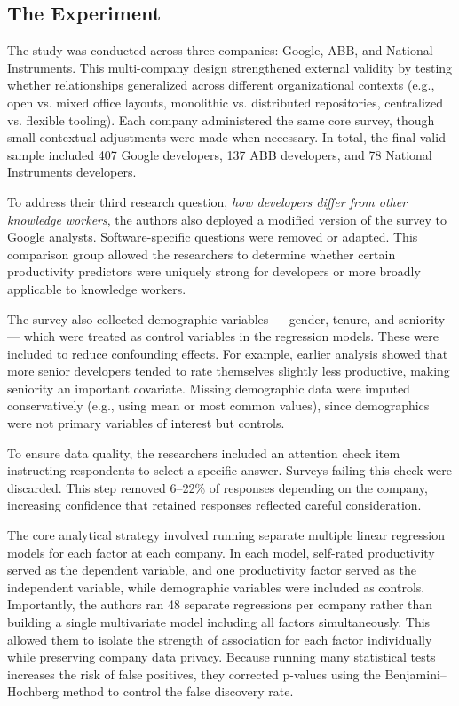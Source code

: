 \subsection{The Experiment}
The study was conducted across three companies: Google, ABB, and National Instruments. This multi-company design strengthened external validity by testing whether relationships generalized across different organizational contexts (e.g., open vs. mixed office layouts, monolithic vs. distributed repositories, centralized vs. flexible tooling). Each company administered the same core survey, though small contextual adjustments were made when necessary. In total, the final valid sample included 407 Google developers, 137 ABB developers, and 78 National Instruments developers.

To address their third research question, \textit{how developers differ from other knowledge workers}, the authors also deployed a modified version of the survey to Google analysts. Software-specific questions were removed or adapted. This comparison group allowed the researchers to determine whether certain productivity predictors were uniquely strong for developers or more broadly applicable to knowledge workers.

The survey also collected demographic variables — gender, tenure, and seniority — which were treated as control variables in the regression models. These were included to reduce confounding effects. For example, earlier analysis showed that more senior developers tended to rate themselves slightly less productive, making seniority an important covariate. Missing demographic data were imputed conservatively (e.g., using mean or most common values), since demographics were not primary variables of interest but controls.

To ensure data quality, the researchers included an attention check item instructing respondents to select a specific answer. Surveys failing this check were discarded. This step removed 6–22\% of responses depending on the company, increasing confidence that retained responses reflected careful consideration.

The core analytical strategy involved running separate multiple linear regression models for each factor at each company. In each model, self-rated productivity served as the dependent variable, and one productivity factor served as the independent variable, while demographic variables were included as controls. Importantly, the authors ran 48 separate regressions per company rather than building a single multivariate model including all factors simultaneously. This allowed them to isolate the strength of association for each factor individually while preserving company data privacy. Because running many statistical tests increases the risk of false positives, they corrected p-values using the Benjamini–Hochberg method to control the false discovery rate.

